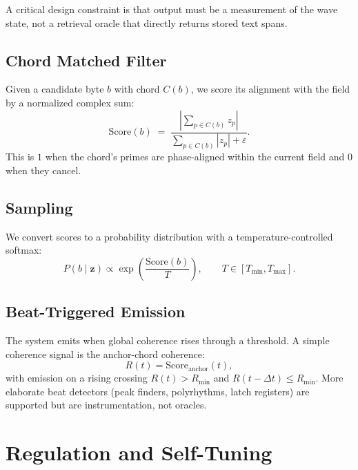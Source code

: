 \documentclass[11pt,a4paper]{article}
\newcommand{\dt}{\Delta t}
\newcommand{\eps}{\varepsilon}
\newcommand{\temperature}{T}
\newcommand{\coh}{R}              %
\newcommand{\z}{z}                %
\newcommand{\zvec}{\bm{z}}
\begin{document}
A critical design constraint is that output must be a measurement of the wave state, not a retrieval oracle that directly returns stored text spans.

\subsection{Chord Matched Filter}
Given a candidate byte $b$ with chord $C(b)$, we score its alignment with the field by a normalized complex sum:
\begin{equation}
\text{Score}(b) \;=\; \frac{\left|\sum_{p\in C(b)} \z_p\right|}{\sum_{p\in C(b)} |\z_p| + \eps}.
\label{eq:score_chord}
\end{equation}
This is $1$ when the chord's primes are phase-aligned within the current field and $0$ when they cancel.

\subsection{Sampling}
We convert scores to a probability distribution with a temperature-controlled softmax:
\begin{equation}
P(b \mid \zvec) \propto \exp\!\left(\frac{\text{Score}(b)}{\temperature}\right),
\qquad \temperature\in[\temperature_{\min},\temperature_{\max}].
\label{eq:readout_softmax}
\end{equation}

\subsection{Beat-Triggered Emission}
The system emits when global coherence rises through a threshold. A simple coherence signal is the anchor-chord coherence:
\begin{equation}
\coh(t) = \text{Score}_{\text{anchor}}(t),
\end{equation}
with emission on a rising crossing $\coh(t)>\coh_{\min}$ and $\coh(t-\dt)\le \coh_{\min}$. More elaborate beat detectors (peak finders, polyrhythms, latch registers) are supported but are instrumentation, not oracles.





\section{Regulation and Self-Tuning}
\label{sec:regulation}
\label{subsec:dissipation}%
\end{document}
